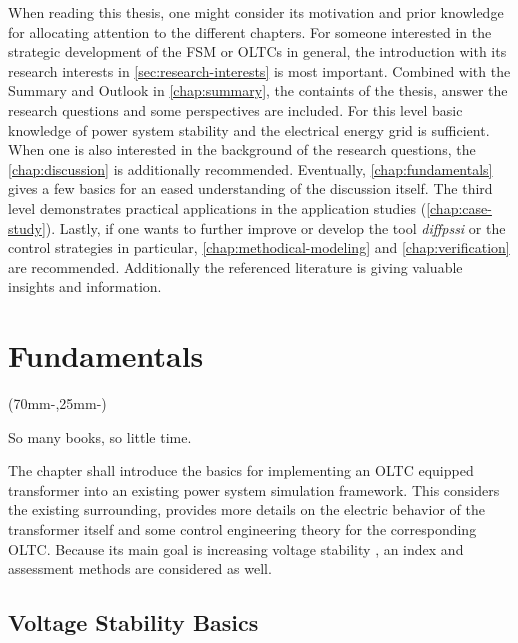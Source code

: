 When reading this thesis, one might consider its motivation and prior knowledge for allocating attention to the different chapters.
For someone interested in the strategic development of the \acs{FSM} or \acsp{OLTC} in general, the introduction with its research interests in \autoref{sec:research-interests} is most important. 
Combined with the Summary and Outlook in \autoref{chap:summary}, the containts of the thesis, answer the research questions and some perspectives are included.
For this level basic knowledge of power system stability and the electrical energy grid is sufficient.
When one is also interested in the background of the research questions, the  \autoref{chap:discussion} is additionally recommended. 
Eventually, \autoref{chap:fundamentals} gives a few basics for an eased understanding of the discussion itself.
The third level demonstrates practical applications in the application studies (\autoref{chap:case-study}).
Lastly, if one wants to further improve or develop the tool {\itshape diffpssi} or the control strategies in particular, \autoref{chap:methodical-modeling} and \autoref{chap:verification} are recommended.
Additionally the referenced literature is giving valuable insights and information.

\chapter{Fundamentals}
\label{chap:fundamentals}

\begin{textblock*}{.7\textwidth}(70mm-\offset,25mm-\offset)
    \begin{fquote}
        So many books, so little time.
    \end{fquote}
\end{textblock*}

The chapter shall introduce the basics for implementing an \acs{OLTC} equipped transformer into an existing power system simulation framework.
This considers the existing surrounding, provides more details on the electric behavior of the transformer itself and some control engineering theory for the corresponding \acs{OLTC}. 
Because its main goal is increasing voltage stability \autocite{machowski_2020}, an index and assessment methods are considered as well.

\section{Voltage Stability Basics}
\label{sec:voltage-stability}

